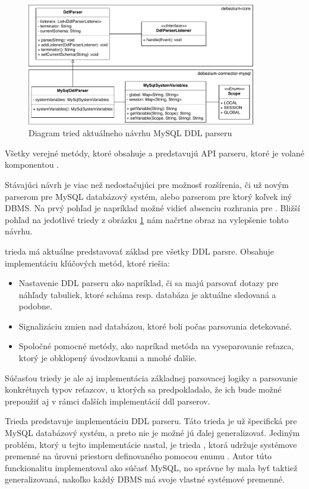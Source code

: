 \begin{figure}[H]
\begin{center}
\includegraphics[width=10cm]{figures/Old_modules.pdf}
\caption{Diagram tried aktuálneho návrhu MySQL DDL parseru}
\label{fig:class_diagram_old}
\end{center}
\end{figure}

Všetky verejné metódy, ktoré obsahuje  a  predstavujú API parseru, ktoré je volané komponentou . 

Stávajúci návrh je viac než nedostačujúci pre možnosť rozšírenia, či už novým parserom pre MySQL databázový systém, alebo parserom pre ktorý koľvek iný DBMS. Na prvý pohľad je napríklad možné vidieť absenciu rozhrania pre . Bližší pohľad na jedotlivé triedy z obrázku \ref{fig:class_diagram_old} nám načrtne obraz na vylepšenie tohto návrhu.

 trieda má aktuálne predstavovať základ pre všetky DDL parsre. Obsahuje implementáciu kľúčových metód, ktoré riešia: 
\begin{itemize}
\item Nastavenie DDL parseru ako napríklad, či sa majú parsovať dotazy pre náhľady tabuliek, ktoré scháma resp. databáza je aktuálne sledovaná a podobne.
\item Signalizáciu zmien nad databázou, ktoré boli počas parsovania detekované.
\item Spoločné pomocné metódy, ako napríkad metóda na vyseparovanie reťazca, ktorý je obklopený úvodzovkami a mnohé ďalšie.
\end{itemize}

Súčasťou  triedy je ale aj implementácia základnej parsovacej logiky a parsovanie konkrétnych typov reťazcov, u ktorých sa predpokladalo, že ich bude možné prepoužiť aj v rámci ďalších implementácií ddl parserov.

Trieda  predstavuje implementáciu DDL parseru. Táto trieda je už špecifická pre MySQL databázový systém, a preto nie je možné jú ďalej generalizovať. Jediným problém, ktorý u tejto implementácie nastal, je trieda , ktorá udržuje systémove premenné na úrovni priestoru definovaného pomocou enumu . Autor túto funckionalitu implementoval ako súčasť MySQL, no správne by mala byť taktiež generalizovaná, nakoľko každý DBMS má svoje vlastné systémové premenné.

